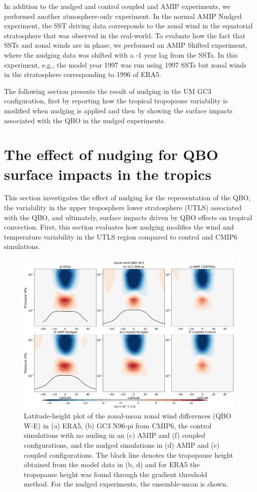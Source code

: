 In addition to the nudged and control coupled and AMIP experiments, we performed another atmosphere-only experiment. In the normal AMIP Nudged experiment, the SST driving data corresponds to the zonal wind in the equatorial stratosphere that was observed in the real-world. To evaluate how the fact that SSTs and zonal winds are in phase, we performed an AMIP Shifted experiment, where the nudging data was shifted with a -1 year lag from the SSTs. In this experiment, e.g., the model year 1997 was run using 1997 SSTs but zonal winds in the stratosphere corresponding to 1996 of ERA5. 

The following section presents the result of nudging in the UM GC3 configuration, first by reporting how the tropical tropopause variability is modified when nudging is applied and then by showing the surface impacts associated with the QBO in the nudged experiments.

\section{The effect of nudging for QBO surface impacts in the tropics}

This section investigates the effect of nudging for the representation of the QBO, the variability in the upper troposphere lower stratosphere (UTLS) associated with the QBO, and ultimately, surface impacts driven by QBO effects on tropical convection. 
First, this section evaluates how nudging modifies the wind and temperature variability in the UTLS region compared to control and CMIP6 simulations.  

\begin{figure}[t!]
\centering
 \includegraphics[width=\linewidth]{figures/zonalplotx_wind.png}
\caption[Zonal mean zonal wind QBO difference]{Latitude-height plot of the zonal-mean zonal wind differences (QBO W-E) in (a) ERA5, (b) GC3 N96-pi from CMIP6, the control simulations with no nuding in an (c) AMIP and (f) coupled configurations, and the nudged simulations in (d) AMIP and (e) coupled configurations. The black line denotes the tropopause height obtained from the model data in (b, d) and for ERA5 the tropopause height was found through the gradient threshold method. For the nudged experiments, the ensemble-mean is shown. }
\label{fig:zonal_u}
\end{figure}


